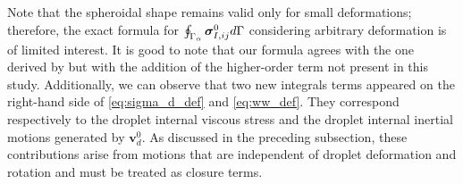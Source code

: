 Note that the spheroidal shape remains valid only for small deformations; therefore, the exact formula for $\oint_{\Gamma_{\alpha}} \bm\sigma_{I,ij}^0 d\Gamma$ considering arbitrary deformation is of limited interest. 
It is good to note that our formula agrees with the one derived by \citet{lhuillier1987phenomenology} but with the addition of the higher-order term not present in this study. 
Additionally, we can observe that two new integrals terms appeared on the right-hand side of \ref{eq:sigma_d_def}  and \ref{eq:ww_def}. 
They correspond respectively to the droplet internal viscous stress and the droplet internal inertial motions generated by $\textbf{v}_d^0$.
As discussed in the preceding subsection, these contributions arise from motions that are independent of droplet deformation and rotation and must be treated as closure terms. 



